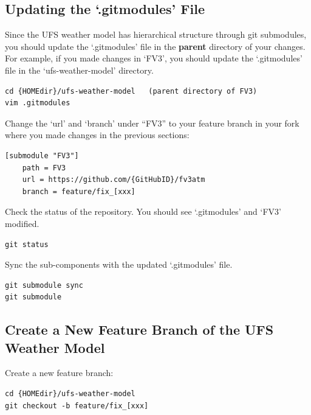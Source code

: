 \documentclass[11pt,fleqn]{report}              %
\begin{document}
\subsection{Updating the `.gitmodules' File}

Since the UFS weather model has hierarchical structure through git submodules, you should update the `.gitmodules' file in the {\bf parent} directory of your changes. For example, if you made changes in `FV3', you should update the `.gitmodules' file in the `ufs-weather-model' directory.
\lstset{language=bash}   
\begin{lstlisting}[frame=trBL]
cd {HOMEdir}/ufs-weather-model   (parent directory of FV3)
vim .gitmodules
\end{lstlisting}

Change the `url' and `branch' under ``FV3'' to your feature branch in your fork where you made changes in the previous sections:
\lstset{language=bash}   
\begin{lstlisting}[frame=trBL]
[submodule "FV3"]
    path = FV3
    url = https://github.com/{GitHubID}/fv3atm
    branch = feature/fix_[xxx]
\end{lstlisting}

Check the status of the repository. You should see `.gitmodules' and `FV3' modified.
\lstset{language=bash}   
\begin{lstlisting}[frame=trBL]
git status
\end{lstlisting}

Sync the sub-components with the updated `.gitmodules' file.
\lstset{language=bash}   
\begin{lstlisting}[frame=trBL]
git submodule sync
git submodule
\end{lstlisting}



\subsection{Create a New Feature Branch of the UFS Weather Model}

Create a new feature branch:
\lstset{language=bash}   
\begin{lstlisting}[frame=trBL]
cd {HOMEdir}/ufs-weather-model
git checkout -b feature/fix_[xxx]
\end{lstlisting}

\vspace{0.3cm}
\end{document}
